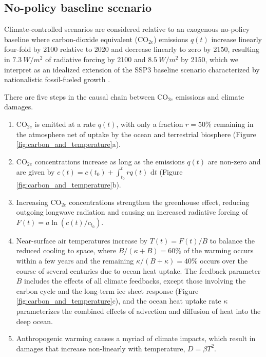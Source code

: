 \documentclass[9pt,twocolumn,twoside,lineno]{pnas-new}
\begin{document}
\subsection*{No-policy baseline scenario}
Climate-controlled scenarios are considered relative to an exogenous no-policy baseline where carbon-dioxide equivalent (CO$_{2e}$) emissions $q(t)$ increase linearly four-fold by 2100 relative to 2020 and decrease linearly to zero by 2150, resulting in $\SI{7.3}{W/m^{2}}$ of radiative forcing by 2100 and $\SI{8.5}{W/m^{2}}$ by 2150, which we interpret as an idealized extension of the SSP3 baseline scenario characterized by nationalistic fossil-fueled growth \cite[][and Section A of the Supplementary Information]{riahi_shared_2017}.

There are five steps in the causal chain between CO$_{2e}$ emissions and climate damages.
\begin{enumerate}
    \item CO$_{2e}$ is emitted at a rate $q(t)$, with only a fraction $r = 50\%$ \cite{solomon_irreversible_2009} remaining in the atmosphere net of uptake by the ocean and terrestrial biosphere (Figure \ref{fig:carbon_and_temperature}a).
    \item CO$_{2e}$ concentrations increase as long as the emissions $q(t)$ are non-zero and are given by $c(t) = c(t_{0}) + \int_{t_{0}}^{t} rq(t)\text{ d}t$ (Figure \ref{fig:carbon_and_temperature}b).
    \item Increasing CO$_{2e}$ concentrations strengthen the greenhouse effect, reducing outgoing longwave radiation and causing an increased radiative forcing of $F(t) = a \ln(c(t)/c_{t_{0}})$. 
    \item Near-surface air temperatures increase by $T(t) = F(t)/B$ to balance the reduced cooling to space, where $B/(\kappa + B) = 60\%$ of the warming occurs within a few years and the remaining $\kappa/(B + \kappa) = 40\%$ occurs over the course of several centuries due to ocean heat uptake. The feedback parameter $B$ includes the effects of all climate feedbacks, except those involving the carbon cycle and the long-term ice sheet response (Figure \ref{fig:carbon_and_temperature}c), and the ocean heat uptake rate $\kappa$ parameterizes the combined effects of advection and diffusion of heat into the deep ocean.
    \item Anthropogenic warming causes a myriad of climate impacts, which result in damages that increase non-linearly with temperature, $D = \beta T^{2}$.
\end{enumerate} 
\end{document}
